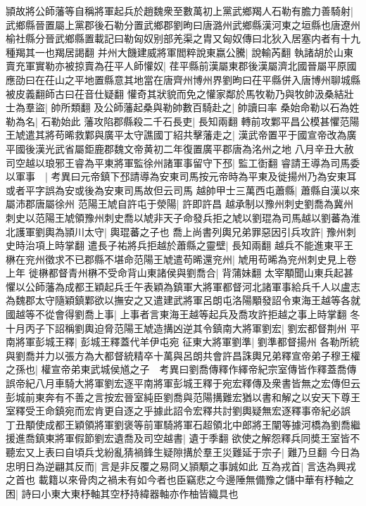 頴故將公師藩等自稱將軍起兵於趙魏衆至數萬初上黨武鄉羯人石勒有膽力善騎射|{
	武鄉縣晉置屬上黨郡後石勒分置武鄉郡劉昫曰唐潞州武鄉縣漢河東之垣縣也唐遼州榆社縣分晉武鄉縣置載記曰勒匈奴别部羌渠之胄又匈奴傳曰北狄入居塞内者有十九種羯其一也羯居謁翻}
并州大饑建威將軍閻粹說東嬴公騰|{
	說輸芮翻}
執諸胡於山東賣充軍實勒亦被掠賣為茌平人師懽奴|{
	荏平縣前漢屬東郡後漢屬濟北國晉屬平原國應劭曰在茌山之平地置縣意其地當在唐齊州博州界劉昫曰茌平縣併入唐博州聊城縣被皮義翻師古曰茌音仕疑翻}
懽奇其狀貌而免之懽家鄰於馬牧勒乃與牧帥汲桑結壯士為羣盜|{
	帥所類翻}
及公師藩起桑與勒帥數百騎赴之|{
	帥讀曰率}
桑始命勒以石為姓勒為名|{
	石勒始此}
藩攻陷郡縣殺二千石長吏|{
	長知兩翻}
轉前攻鄴平昌公模甚懼范陽王虓遣其將苟晞救鄴與廣平太守譙國丁紹共擊藩走之|{
	漢武帝置平于國宣帝改為廣平國後漢光武省屬鉅鹿郡魏文帝黄初二年復置廣平郡唐為洺州之地}
八月辛丑大赦　司空越以琅邪王睿為平東將軍監徐州諸軍事留守下邳|{
	監工衘翻}
睿請王導為司馬委以軍事　|{
	考異曰元帝鎮下邳請導為安東司馬按元帝時為平東及徙揚州乃為安東耳或者平字誤為安或後為安東司馬故但云司馬}
越帥甲士三萬西屯蕭縣|{
	蕭縣自漢以來屬沛郡唐屬徐州}
范陽王虓自許屯于滎陽|{
	許即許昌}
越承制以豫州刺史劉喬為冀州刺史以范陽王虓領豫州刺史喬以虓非天子命發兵拒之虓以劉琨為司馬越以劉蕃為淮北護軍劉輿為頴川太守|{
	輿琨蕃之子也}
喬上尚書列輿兄弟罪惡因引兵攻許|{
	豫州刺史時治項上時掌翻}
遣長子祐將兵拒越於蕭縣之靈壁|{
	長知兩翻}
越兵不能進東平王楙在兖州徵求不已郡縣不堪命范陽王虓遣苟晞還兖州|{
	虓用苟晞為兖州刺史見上卷上年}
徙楙都督青州楙不受命背山東諸侯與劉喬合|{
	背蒲妹翻}
太宰顒聞山東兵起甚懼以公師藩為成都王穎起兵壬午表穎為鎮軍大將軍都督河北諸軍事給兵千人以盧志為魏郡太守隨穎鎮鄴欲以撫安之又遣建武將軍呂朗屯洛陽顒發詔令東海王越等各就國越等不從會得劉喬上事|{
	上事者言東海王越等起兵及喬攻許拒越之事上時掌翻}
冬十月丙子下詔稱劉輿迫脅范陽王虓造搆凶逆其令鎮南大將軍劉宏|{
	劉宏都督荆州}
平南將軍彭城王釋|{
	彭城王釋蓋代羊伊屯宛}
征東大將軍劉準|{
	劉準都督揚州}
各勒所統與劉喬并力以張方為大都督統精卒十萬與呂朗共會許昌誅輿兄弟釋宣帝弟子穆王權之孫也|{
	權宣帝弟東武城侯馗之子　考異曰劉喬傳釋作繹帝紀宗室傳皆作釋蓋喬傳誤帝紀八月車騎大將軍劉宏逐平南將軍彭城王釋于宛宏釋傳及衆書皆無之宏傳但云彭城前東奔有不善之言按宏晉室純臣劉喬與范陽搆難宏猶以書和解之以安天下尊王室釋受王命鎮宛而宏肯更自逐之乎據此詔令宏釋共討劉輿疑無宏逐釋事帝紀必誤}
丁丑顒使成都王穎領將軍劉褒等前軍騎將軍石超領北中郎將王闡等據河橋為劉喬繼援進喬鎮東將軍假節劉宏遺喬及司空越書|{
	遺于季翻}
欲使之解怨釋兵同奬王室皆不聽宏又上表曰自頃兵戈紛亂猜禍鋒生疑隙搆於羣王災難延于宗子|{
	難乃旦翻}
今日為忠明日為逆翩其反而|{
	言是非反覆之易冏乂頴顒之事誠如此}
互為戎首|{
	言迭為興戎之首也}
載籍以來骨肉之禍未有如今者也臣竊悲之今邊陲無備豫之儲中華有杼軸之困|{
	詩曰小東大東杼軸其空杼持緯器軸亦作柚皆織具也}
